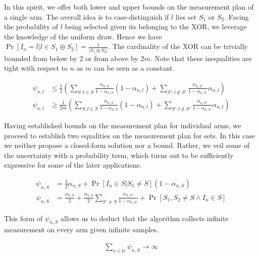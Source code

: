 In this spirit, we offer both lower and upper bounds on the measurement plan of a single arm. The overall idea is to case-distinguish if $l$ lies set $S_1$ or $S_2$. Facing the probability of $l$ being selected given its belonging to the XOR, we leverage the knowledge of the uniform draw. Hence we have $\Pr[I_n = l|l \in S_1 \oplus S_2] = \frac{1}{|S_1 \oplus S_2|}$. The cardinality of the XOR can be trivially bounded from below by 2 or from above by 2$m$. Note that these inequalities are tight with respect to $n$ as $m$ can be seen as a constant.
\begin{proposition}\label{proposition:measurement_plan_arm}
  \begin{align}
    \psi_{n, l} &\leq \frac{1}{2}(\sum_{S: l \in S} \frac{\alpha_{n, S}}{1 - \alpha_{n, S}} (1 - \alpha_{n, l}) +  \sum_{S': l \notin S'} \frac{\alpha_{n, S'}}{1 - \alpha_{n, S'}} \alpha_{n, l}) \\
    \psi_{n, l} &\geq \frac{1}{2m}(\sum_{S: l \in S} \frac{\alpha_{n, S}}{1 - \alpha_{n, S}} (1 - \alpha_{n, l}) +  \sum_{S': l \notin S'} \frac{\alpha_{n, S'}}{1 - \alpha_{n, S'}} \alpha_{n, l})
  \end{align}
\end{proposition}
Having established bounds on the measurement plan for individual arms, we proceed to establish two equalities on the measurement plan for sets. In this case we neither propose a closed-form solution nor a bound. Rather, we veil some of the uncertainty with a probability term, which turns out to be sufficiently expressive for some of the later applications.
\begin{proposition}\label{proposition:measurement_pan_set}
  \begin{align}
    \psi_{n, S} &= \frac{1}{2} \alpha_{n, S} +  \Pr[I_n \in S | S_1 \neq S] (1 - \alpha_{n, S}) \\
    \psi_{n, S} &= \frac{\alpha_{n, S}}{2} +  \frac{\alpha_{n, S}}{2} \sum_{S'\neq S} \frac{\alpha_{n, S'}}{1 - \alpha_{n, S'}} + \Pr[S_1, S_2 \neq S \wedge I_n \in S]
  \end{align}
\end{proposition}
This form of $\psi_{n, S}$ allows us to deduct that the algorithm collects infinite measurement on every arm given infinite samples.
\begin{lemma}\label{lemma:infinite_measurement}
  \begin{align}
    \sum_{n \in \mathbb{N}} \psi_{n, S} \rightarrow \infty
  \end{align}
\end{lemma}
